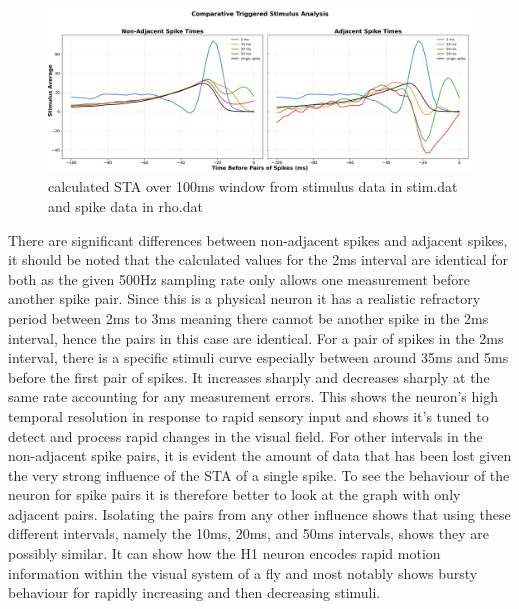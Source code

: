 \documentclass[11pt]{article}
\begin{document}
\begin{figure}[H]
    \centering
    \includegraphics[width=1.0\linewidth]{Figure_STA_pairs.png}
    \caption{calculated STA over 100ms window from stimulus data in stim.dat and spike data in rho.dat}
    \label{fig:STAgraph2}
\end{figure}

There are significant differences between non-adjacent spikes and adjacent spikes, it should be noted that the calculated values for the 2ms interval are identical for both as the given 500Hz sampling rate only allows one measurement before another spike pair. Since this is a physical neuron it has a realistic refractory period between 2ms to 3ms meaning there cannot be another spike in the 2ms interval, hence the pairs in this case are identical.
For a pair of spikes in the 2ms interval, there is a specific stimuli curve especially between around 35ms and 5ms before the first pair of spikes. It increases sharply and decreases sharply at the same rate accounting for any measurement errors. This shows the neuron's high temporal resolution in response to rapid sensory input and shows it's tuned to detect and process rapid changes in the visual field.
For other intervals in the non-adjacent spike pairs, it is evident the amount of data that has been lost given the very strong influence of the STA of a single spike. To see the behaviour of the neuron for spike pairs it is therefore better to look at the graph with only adjacent pairs. Isolating the pairs from any other influence shows that using these different intervals, namely the 10ms, 20ms, and 50ms intervals, shows they are possibly similar. It can show how the H1 neuron encodes rapid motion information within the visual system of a fly and most notably shows bursty behaviour for rapidly increasing and then decreasing stimuli.
\end{document}
